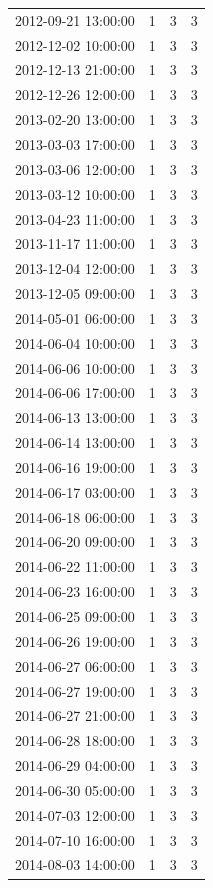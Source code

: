 \begin{tabular}{lrrr}
2012-09-21 13:00:00 & 1 & 3 & 3 \\
2012-12-02 10:00:00 & 1 & 3 & 3 \\
2012-12-13 21:00:00 & 1 & 3 & 3 \\
2012-12-26 12:00:00 & 1 & 3 & 3 \\
2013-02-20 13:00:00 & 1 & 3 & 3 \\
2013-03-03 17:00:00 & 1 & 3 & 3 \\
2013-03-06 12:00:00 & 1 & 3 & 3 \\
2013-03-12 10:00:00 & 1 & 3 & 3 \\
2013-04-23 11:00:00 & 1 & 3 & 3 \\
2013-11-17 11:00:00 & 1 & 3 & 3 \\
2013-12-04 12:00:00 & 1 & 3 & 3 \\
2013-12-05 09:00:00 & 1 & 3 & 3 \\
2014-05-01 06:00:00 & 1 & 3 & 3 \\
2014-06-04 10:00:00 & 1 & 3 & 3 \\
2014-06-06 10:00:00 & 1 & 3 & 3 \\
2014-06-06 17:00:00 & 1 & 3 & 3 \\
2014-06-13 13:00:00 & 1 & 3 & 3 \\
2014-06-14 13:00:00 & 1 & 3 & 3 \\
2014-06-16 19:00:00 & 1 & 3 & 3 \\
2014-06-17 03:00:00 & 1 & 3 & 3 \\
2014-06-18 06:00:00 & 1 & 3 & 3 \\
2014-06-20 09:00:00 & 1 & 3 & 3 \\
2014-06-22 11:00:00 & 1 & 3 & 3 \\
2014-06-23 16:00:00 & 1 & 3 & 3 \\
2014-06-25 09:00:00 & 1 & 3 & 3 \\
2014-06-26 19:00:00 & 1 & 3 & 3 \\
2014-06-27 06:00:00 & 1 & 3 & 3 \\
2014-06-27 19:00:00 & 1 & 3 & 3 \\
2014-06-27 21:00:00 & 1 & 3 & 3 \\
2014-06-28 18:00:00 & 1 & 3 & 3 \\
2014-06-29 04:00:00 & 1 & 3 & 3 \\
2014-06-30 05:00:00 & 1 & 3 & 3 \\
2014-07-03 12:00:00 & 1 & 3 & 3 \\
2014-07-10 16:00:00 & 1 & 3 & 3 \\
2014-08-03 14:00:00 & 1 & 3 & 3 \\

\end{tabular}
